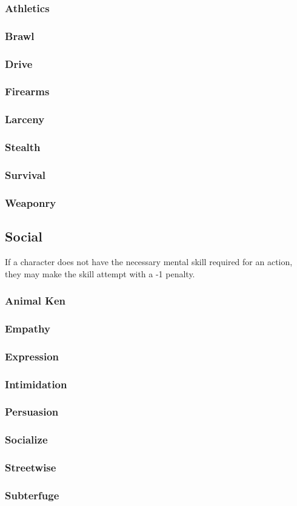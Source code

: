 \documentclass["../Misguided by Starlight.tex"]{subfiles}
\begin{document}
\subsubsection{Athletics}
\subsubsection{Brawl}
\subsubsection{Drive}
\subsubsection{Firearms}
\subsubsection{Larceny}
\subsubsection{Stealth}
\subsubsection{Survival}
\subsubsection{Weaponry}

\subsection{Social}
If a character does not have the necessary mental skill required for an action, they may make the skill attempt with a -1 penalty.

\subsubsection{Animal Ken}
\subsubsection{Empathy}
\subsubsection{Expression}
\subsubsection{Intimidation}
\subsubsection{Persuasion}
\subsubsection{Socialize}
\subsubsection{Streetwise}
\subsubsection{Subterfuge}
\end{document}
